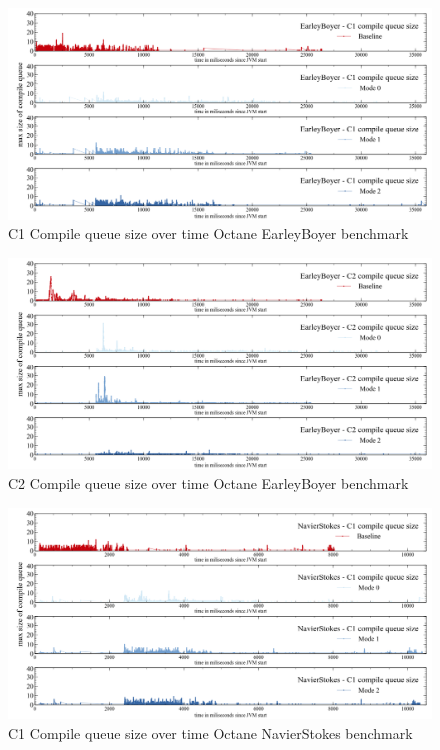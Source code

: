 \begin{figure}[ht]
  \begin{center}
    \centering
    \includegraphics[width=1.0\textwidth]{figures/octane_queue_earleyboyer_separate_c1.png}
    \caption{C1 Compile queue size over time Octane EarleyBoyer benchmark}
    \label{f:octane_queue_earleyboyer_separate_c1}
  \end{center}
\end{figure}
\begin{figure}[ht]
  \begin{center}
    \centering
    \includegraphics[width=1.0\textwidth]{figures/octane_queue_earleyboyer_separate_c2.png}
    \caption{C2 Compile queue size over time Octane EarleyBoyer benchmark}
    \label{f:octane_queue_earleyboyer_separate_c2}
  \end{center}
\end{figure}
\begin{figure}[ht]
  \begin{center}
    \centering
    \includegraphics[width=1.0\textwidth]{figures/octane_queue_navierstokes_separate_c1.png}
    \caption{C1 Compile queue size over time Octane NavierStokes benchmark}
    \label{f:octane_queue_navierstokes_separate_c1}
  \end{center}
\end{figure}
